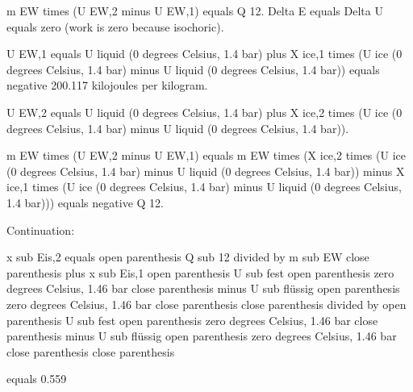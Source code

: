 m EW times (U EW,2 minus U EW,1) equals Q 12.  
Delta E equals Delta U equals zero (work is zero because isochoric).  

U EW,1 equals U liquid (0 degrees Celsius, 1.4 bar) plus X ice,1 times (U ice (0 degrees Celsius, 1.4 bar) minus U liquid (0 degrees Celsius, 1.4 bar)) equals negative 200.117 kilojoules per kilogram.  

U EW,2 equals U liquid (0 degrees Celsius, 1.4 bar) plus X ice,2 times (U ice (0 degrees Celsius, 1.4 bar) minus U liquid (0 degrees Celsius, 1.4 bar)).  

m EW times (U EW,2 minus U EW,1) equals m EW times (X ice,2 times (U ice (0 degrees Celsius, 1.4 bar) minus U liquid (0 degrees Celsius, 1.4 bar)) minus X ice,1 times (U ice (0 degrees Celsius, 1.4 bar) minus U liquid (0 degrees Celsius, 1.4 bar))) equals negative Q 12.

Continuation:  

x sub Eis,2 equals open parenthesis Q sub 12 divided by m sub EW close parenthesis plus x sub Eis,1 open parenthesis U sub fest open parenthesis zero degrees Celsius, 1.46 bar close parenthesis minus U sub flüssig open parenthesis zero degrees Celsius, 1.46 bar close parenthesis close parenthesis divided by open parenthesis U sub fest open parenthesis zero degrees Celsius, 1.46 bar close parenthesis minus U sub flüssig open parenthesis zero degrees Celsius, 1.46 bar close parenthesis close parenthesis  

equals 0.559